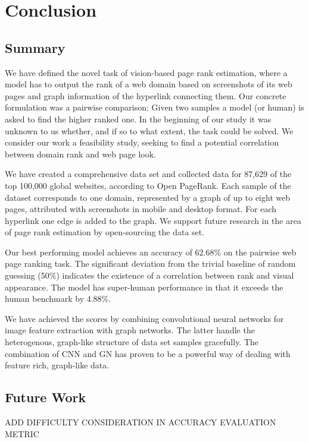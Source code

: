 \section{Conclusion}
\label{sec:conclusion}

\subsection{Summary}

We have defined the novel task of vision-based page rank estimation, where a model has to output the rank of a web domain based on screenshots of its web pages and graph information of the hyperlink connecting them. Our concrete formulation was a pairwise comparison: Given two samples a model (or human) is asked to find the higher ranked one. In the beginning of our study it was unknown to us whether, and if so to what extent, the task could be solved. We consider our work a feasibility study, seeking to find a potential correlation between domain rank and web page look.

We have created a comprehensive data set and collected data for 87,629 of the top 100,000 global websites, according to Open PageRank. Each sample of the dataset corresponds to one domain, represented by a graph of up to eight web pages, attributed with screenshots in mobile and desktop format. For each hyperlink one edge is added to the graph. We support future research in the area of page rank estimation by open-sourcing the data set.

Our best performing model achieves an accuracy of 62.68\% on the pairwise web page ranking task. The significant deviation from the trivial baseline of random guessing (50\%) indicates the existence of a correlation between rank and visual appearance. The model has super-human performance in that it exceeds the human benchmark by 4.88\%.

We have achieved the scores by combining convolutional neural networks for image feature extraction with graph networks. The latter handle the heterogenous, graph-like structure of data set samples gracefully. The combination of CNN and GN has proven to be a powerful way of dealing with feature rich, graph-like data.

\subsection{Future Work}

ADD DIFFICULTY CONSIDERATION IN ACCURACY EVALUATION METRIC

